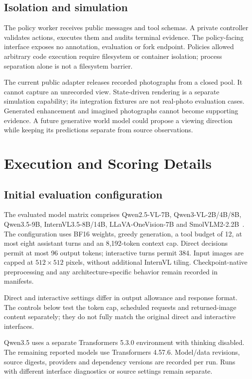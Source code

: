 \subsection{Isolation and simulation}
The policy worker receives public messages and tool schemas.
A private controller validates actions, executes them and audits terminal evidence.
The policy-facing interface exposes no annotation, evaluation or fork endpoint.
Policies allowed arbitrary code execution require filesystem or container isolation; process separation alone is not a filesystem barrier.

The current public adapter releases recorded photographs from a closed pool.
It cannot capture an unrecorded view.
State-driven rendering is a separate simulation capability; its integration fixtures are not real-photo evaluation cases.
Generated enhancement and imagined photographs cannot become supporting evidence.
A future generative world model could propose a viewing direction while keeping its predictions separate from source observations.

\section{Execution and Scoring Details}
\subsection{Initial evaluation configuration}
The evaluated model matrix comprises Qwen2.5-VL-7B, Qwen3-VL-2B/4B/8B, Qwen3.5-9B, InternVL3.5-8B/14B, LLaVA-OneVision-7B and SmolVLM2-2.2B~\cite{qwen25,qwen3,qwen35,internvl35,llavaonevision,smolvlm2}.
The configuration uses BF16 weights, greedy generation, a tool budget of 12, at most eight assistant turns and an 8,192-token context cap.
Direct decisions permit at most 96 output tokens; interactive turns permit 384.
Input images are capped at \(512\times512\) pixels, without additional InternVL tiling.
Checkpoint-native preprocessing and any architecture-specific behavior remain recorded in manifests.

Direct and interactive settings differ in output allowance and response format.
The controls below test the token cap, scheduled requests and returned-image content separately; they do not fully match the original direct and interactive interfaces.

Qwen3.5 uses a separate Transformers 5.3.0 environment with thinking disabled.
The remaining reported models use Transformers 4.57.6.
Model/data revisions, source digests, providers and dependency versions are recorded per run.
Runs with different interface diagnostics or source settings remain separate.

